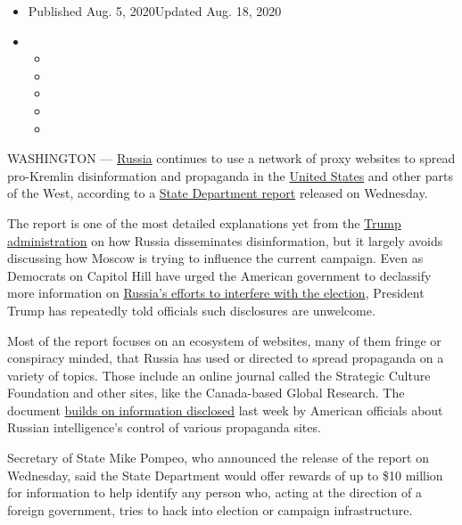 \begin{itemize}
\item
  Published Aug. 5, 2020Updated Aug. 18, 2020
\item
  \begin{itemize}
  \item
  \item
  \item
  \item
  \item
  \end{itemize}
\end{itemize}

WASHINGTON ---
\href{https://www.nytimes3xbfgragh.onion/2020/08/18/us/politics/trump-russia-senate.html}{Russia}
continues to use a network of proxy websites to spread pro-Kremlin
disinformation and propaganda in the
\href{https://www.nytimes3xbfgragh.onion/2020/08/18/us/politics/trump-russia-senate.html}{United
States} and other parts of the West, according to a
\href{https://content.govdelivery.com/attachments/USSTATEBPA/2020/08/05/file_attachments/1512230/Pillars\%20of\%20Russias\%20Disinformation\%20and\%20Propaganda\%20Ecosystem_08-04-20\%20\%281\%29.pdf}{State
Department report} released on Wednesday.

The report is one of the most detailed explanations yet from the
\href{https://www.nytimes3xbfgragh.onion/2020/08/18/us/politics/trump-russia-senate.html}{Trump
administration} on how Russia disseminates disinformation, but it
largely avoids discussing how Moscow is trying to influence the current
campaign. Even as Democrats on Capitol Hill have urged the American
government to declassify more information on
\href{https://www.nytimes3xbfgragh.onion/2020/08/18/us/politics/senate-intelligence-russian-interference-report.html}{Russia's
efforts to interfere with the election}, President Trump has repeatedly
told officials such disclosures are unwelcome.

Most of the report focuses on an ecosystem of websites, many of them
fringe or conspiracy minded, that Russia has used or directed to spread
propaganda on a variety of topics. Those include an online journal
called the Strategic Culture Foundation and other sites, like the
Canada-based Global Research. The document
\href{https://www.nytimes3xbfgragh.onion/2020/07/28/us/politics/russia-disinformation-coronavirus.html}{builds
on information disclosed} last week by American officials about Russian
intelligence's control of various propaganda sites.

Secretary of State Mike Pompeo, who announced the release of the report
on Wednesday, said the State Department would offer rewards of up to
\$10 million for information to help identify any person who, acting at
the direction of a foreign government, tries to hack into election or
campaign infrastructure.

